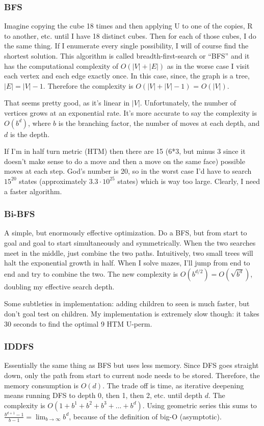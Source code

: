 \documentclass[11pt, oneside]{article}
\begin{document}
\subsubsection{BFS}
Imagine copying the cube 18 times and then applying U to one of the copies, R
to another, etc. until I have 18 distinct cubes. Then for each of those cubes,
I do the same thing. If I enumerate every single possibility, I will of course
find the shortest solution. This algorithm is called breadth-first-search or
``BFS'' and it has the computational complexity of \( O(|V| + |E|)\) as in the
worse case I visit each vertex and each edge exactly once. In this case, since,
the graph is a tree, \( |E| = |V| - 1\). Therefore the complexity is \( O(|V|
+ |V| - 1)\) = \( O(|V|) \).

That seems pretty good, as it's linear in \( |V| \). Unfortunately, the
number of vertices grows at an exponential rate. It's more accurate to say
the complexity is \( O(b^d) \), where \( b \) is the branching factor, the
number of moves at each depth, and \( d \) is the depth.

If I'm in half turn metric (HTM) then there are 15 (6*3, but minus 3 since it
doesn't make sense to do a move and then a move on the same face) possible
moves at each step. God's number is 20, so in the worst case I'd have to
search \( 15^{20} \) states (approximately \(3.3 \cdot 10^{25} \) states)
which is way too large. Clearly, I need a faster algorithm.

\subsubsection{Bi-BFS}
A simple, but enormously effective optimization. Do a BFS, but from start
to goal and goal to start simultaneously and symmetrically. When the two
searches meet in the middle, just combine the two paths. Intuitively, two
small trees will halt the exponential growth in half. When I solve mazes,
I'll jump from end to end and try to combine the two. The new complexity
is \( O(b^{d/2}) = O(\sqrt{b^d}) \), doubling my effective search depth.

Some subtleties in implementation: adding children to seen is much
faster, but don't goal test on children. My implementation is extremely
slow though: it takes 30 seconds to find the optimal 9 HTM U-perm.

\subsubsection{IDDFS}
Essentially the same thing as BFS but uses less memory. Since DFS goes
straight down, only the path from start to current node needs to be stored.
Therefore, the memory consumption is \( O(d) \). The trade off is time, as
iterative deepening means running DFS to depth 0, then 1, then 2, etc. until
depth \( d \). The complexity is \( O(1 + b^1 + b^2 + b^3 + ... + b^d) \).
Using geometric series this sums to \( \frac{b^{d + 1} - 1}{b - 1} = \lim_{b
\to \infty} b^d\), because of the definition of big-O (asymptotic).
\end{document}
